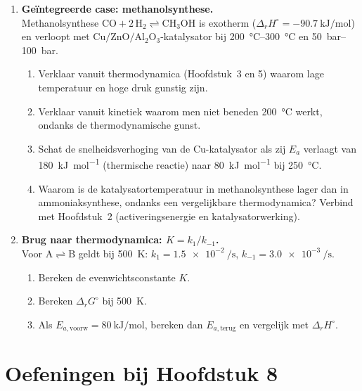 \begin{enumerate}
\item \textbf{Geïntegreerde case: methanolsynthese.} \\
Methanolsynthese $\mathrm{CO + 2\,H_2 \rightleftharpoons CH_3OH}$ is exotherm ($\Delta_r H^\circ = \SI{-90.7}{\kilo\joule\per\mole}$) en verloopt met $\mathrm{Cu/ZnO/Al_2O_3}$-katalysator bij \SIrange{200}{300}{\celsius} en \SIrange{50}{100}{\bar}.
\begin{enumerate}
\item[(a)] Verklaar vanuit thermodynamica (Hoofdstuk~3 en 5) waarom lage temperatuur en hoge druk gunstig zijn.
\item[(b)] Verklaar vanuit kinetiek waarom men niet beneden \SI{200}{\celsius} werkt, ondanks de thermodynamische gunst.
\item[(c)] Schat de snelheidsverhoging van de $\mathrm{Cu}$-katalysator als zij $E_a$ verlaagt van \SI{180}{\kilo\joule\per\mole} (thermische reactie) naar \SI{80}{\kilo\joule\per\mole} bij \SI{250}{\celsius}.
\item[(d)] Waarom is de katalysatortemperatuur in methanolsynthese lager dan in ammoniaksynthese, ondanks een vergelijkbare thermodynamica? Verbind met Hoofdstuk~2 (activeringsenergie en katalysatorwerking).
\end{enumerate}

\item \textbf{Brug naar thermodynamica: $K = k_1/k_{-1}$.} \\
Voor $\mathrm{A \rightleftharpoons B}$ geldt bij \SI{500}{\kelvin}: $k_1 = \SI{1.5e-2}{\per\second}$, $k_{-1} = \SI{3.0e-3}{\per\second}$.
\begin{enumerate}
\item[(a)] Bereken de evenwichtsconstante $K$.
\item[(b)] Bereken $\Delta_r G^\circ$ bij \SI{500}{\kelvin}.
\item[(c)] Als $E_{a,\text{voorw}} = \SI{80}{\kilo\joule\per\mole}$, bereken dan $E_{a,\text{terug}}$ en vergelijk met $\Delta_r H^\circ$.
\end{enumerate}

\end{enumerate}


\section*{Oefeningen bij Hoofdstuk 8}

